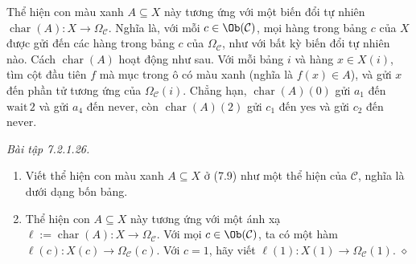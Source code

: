 Thể hiện con màu xanh $A\subseteq X$ này tương ứng với một biến đổi tự nhiên $\operatorname{char}(A):X\to\Omega_{\mathcal C}$. Nghĩa là, với mỗi $c\in\Ob(\mathcal C)$, mọi hàng trong bảng $c$ của $X$ được gửi đến các hàng trong bảng $c$ của $\Omega_{\mathcal C}$, như với bất kỳ biến đổi tự nhiên nào. Cách $\operatorname{char}(A)$ hoạt động như sau. Với mỗi bảng $i$ và hàng $x\in X(i)$, tìm cột đầu tiên $f$ mà mục trong ô có màu xanh (nghĩa là $f(x)\in A$), và gửi $x$ đến phần tử tương ứng của $\Omega_{\mathcal C}(i)$. Chẳng hạn, $\operatorname{char}(A)(0)$ gửi $a_1$ đến $\mathrm{wait}\,2$ và gửi $a_4$ đến $\mathrm{never}$, còn $\operatorname{char}(A)(2)$ gửi $c_1$ đến $\mathrm{yes}$ và gửi $c_2$ đến $\mathrm{never}$.

\noindent\textit{Bài tập 7.2.1.26.}\keepwithnext
\begin{enumerate}[label=\alph*.]
\item Viết thể hiện con màu xanh $A\subseteq X$ ở (7.9) như một thể hiện của $\mathcal C$, nghĩa là dưới dạng bốn bảng.
\item Thể hiện con $A\subseteq X$ này tương ứng với một ánh xạ $\ell:=\operatorname{char}(A):X\to\Omega_{\mathcal C}$. Với mọi $c\in\Ob(\mathcal C)$, ta có một hàm $\ell(c):X(c)\to\Omega_{\mathcal C}(c)$. Với $c=1$, hãy viết $\ell(1):X(1)\to\Omega_{\mathcal C}(1)$.
\nobreak\hfill$\diamond$
\end{enumerate}

